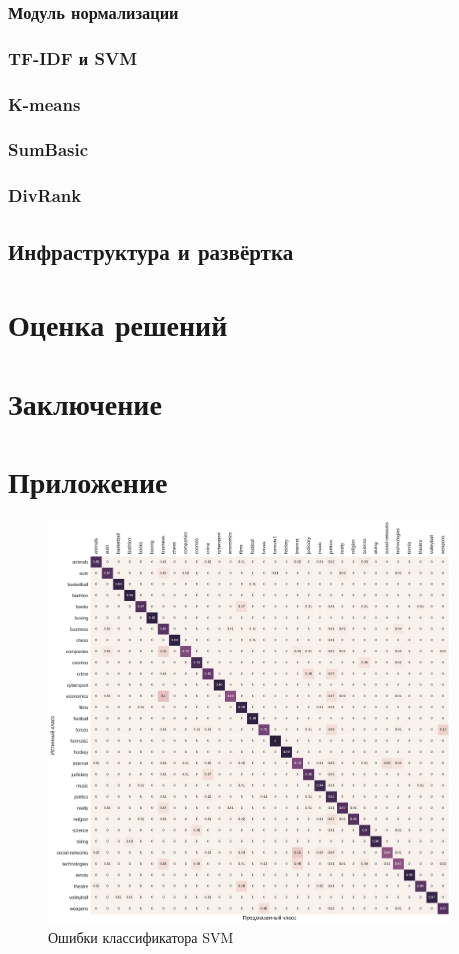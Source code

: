 \documentclass[a4paper, 14pt]{extarticle}
\begin{document}
\subsubsection{Модуль нормализации}
\subsubsection{TF-IDF и SVM}
\subsubsection{K-means}
\subsubsection{SumBasic}
\subsubsection{DivRank}

\subsection{Инфраструктура и развёртка}

\section{Оценка решений}
\section{Заключение}



\section*{Приложение}
\begin{figure}[h!]
	\centering
	\includegraphics[width=0.95\textwidth]{svm_matrix}
	\caption{Ошибки классификатора SVM}
	\label{svm_matrix}
\end{figure}
\end{document}
